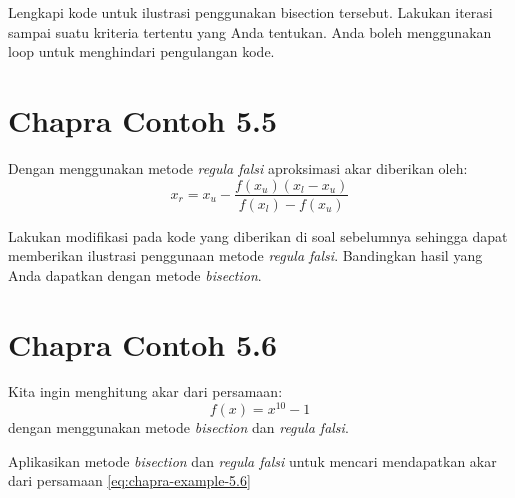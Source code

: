 \begin{soal}
Lengkapi kode untuk ilustrasi penggunakan bisection tersebut. Lakukan iterasi sampai
suatu kriteria tertentu yang Anda tentukan. Anda boleh menggunakan loop
untuk menghindari pengulangan kode.
\end{soal}

\section{Chapra Contoh 5.5}
Dengan menggunakan metode \textit{regula falsi} aproksimasi akar diberikan oleh:
\begin{equation}
x_{r} = x_{u} - \frac{f(x_u)(x_{l} - x_{u})}{f(x_l) - f(x_u)}
\end{equation}

\begin{soal}
Lakukan modifikasi pada kode yang diberikan di soal sebelumnya sehingga dapat
memberikan ilustrasi penggunaan metode \textit{regula falsi}. Bandingkan hasil yang
Anda dapatkan dengan metode \textit{bisection}.
\end{soal}

\section{Chapra Contoh 5.6}

Kita ingin menghitung akar dari persamaan:
\begin{equation}
f(x) = x^{10} - 1
\label{eq:chapra-example-5.6}
\end{equation}
dengan menggunakan metode \textit{bisection} dan \textit{regula falsi}.

\begin{soal}
Aplikasikan metode \textit{bisection} dan \textit{regula falsi} untuk mencari mendapatkan
akar dari persamaan \eqref{eq:chapra-example-5.6}
\end{soal}